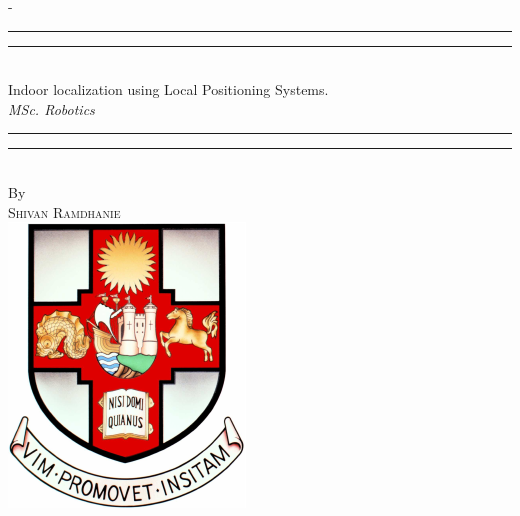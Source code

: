 %
%
% 
%
%
\begin{titlingpage}
\begin{SingleSpace}
\calccentering{\unitlength} 
\begin{adjustwidth*}{\unitlength}{-\unitlength}
\vspace*{13mm}
\begin{center}
\rule[0.5ex]{\linewidth}{2pt}\vspace*{-\baselineskip}\vspace*{3.2pt}
\rule[0.5ex]{\linewidth}{1pt}\\[\baselineskip]
{\HUGE Indoor localization using Local Positioning Systems.}\\[4mm]
{\Large \textit{MSc. Robotics}}\\
\rule[0.5ex]{\linewidth}{1pt}\vspace*{-\baselineskip}\vspace{3.2pt}
\rule[0.5ex]{\linewidth}{2pt}\\
\vspace{6.5mm}
{\large By}\\
\vspace{6.5mm}
{\large\textsc{Shivan Ramdhanie}}\\
\vspace{11mm}
\includegraphics[scale=0.6]{logos/bristolcrest_colour}

\end{center}
\end{adjustwidth*}
\end{SingleSpace}
\end{titlingpage}
